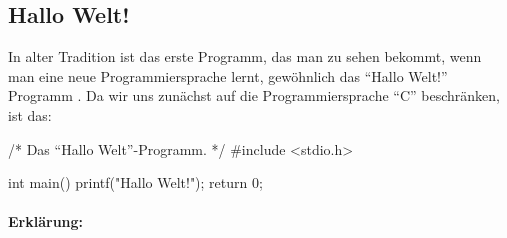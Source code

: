 \subsection{Hallo Welt!}
\label{sec:c:hallo-welt}

In alter Tradition ist das erste Programm, das man zu sehen bekommt, wenn man eine neue Programmiersprache lernt, gewöhnlich das ``Hallo Welt!'' Programm \cite{wikipedia:hallo-welt}. Da wir uns zunächst auf die Programmiersprache ``C'' beschränken, ist das:

\begin{code}
/* Das ``Hallo Welt''-Programm. */
#include <stdio.h>

int main() {
  printf("Hallo Welt!\n");
  return 0;
}
\end{code}

\paragraph{Erklärung:}

